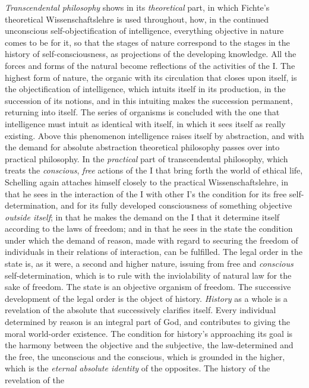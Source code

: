 \emph{Transcendental philosophy} shows in its \emph{theoretical} part, in
which Fichte's theoretical Wissenschaftslehre is used throughout, how, in
the continued unconscious self-objectification of intelligence,
everything objective in nature comes to be for it, so that the stages of
nature correspond to the stages in the history of self-consciousness, as
projections of the developing knowledge. All the forces and forms of the
natural become reflections of the activities of the I. The highest form
of nature, the organic with its circulation that closes upon itself, is
the objectification of intelligence, which intuits itself in its
production, in the succession of its notions, and in this intuiting makes
the succession permanent, returning into itself. The series of organisms
is concluded with the one that intelligence must intuit as identical with
itself, in which it sees itself as really existing. Above this phenomenon
intelligence raises itself by abstraction, and with the demand for
absolute abstraction theoretical philosophy passes over into practical
philosophy. In the \emph{practical} part of transcendental philosophy,
which treats the \emph{conscious}, \emph{free} actions of the I that
bring forth the world of ethical life, Schelling again attaches himself
closely to the practical Wissenschaftslehre, in that he sees in the
interaction of the I with other I's the condition for its free
self-determination, and for its fully developed consciousness of
something objective \emph{outside itself}; in that he makes the demand on
the I that it determine itself according to the laws of freedom; and in
that he sees in the state the condition under which the demand of
reason, made with regard to securing the freedom of individuals in their
relations of interaction, can be fulfilled. The legal order in the state
is, as it were, a second and higher nature, issuing from free
and \emph{conscious} self-determination, which is to rule with the
inviolability of natural law for the sake of freedom. The state is an
objective organism of freedom. The successive development of the legal
order is the object of history. \emph{History} as a whole is a revelation
of the absolute that successively clarifies itself. Every individual
determined by reason is an integral part of God, and contributes to
giving the moral world-order existence. The condition for history's
approaching its goal is the harmony between the objective and the
subjective, the law-determined and the free, the unconscious and the
conscious, which is grounded in the higher, which is the \emph{eternal
absolute identity} of the opposites. The history of the revelation of the
